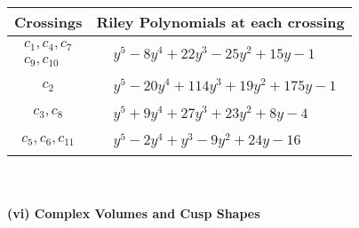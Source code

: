 \documentclass[1p]{elsarticle_modified}
\theoremstyle{definition}
\begin{document}
\begin{tabular}{m{50pt}|m{274pt}}
Crossings & \hspace{64pt}Riley Polynomials at each crossing \\
\hline $$\begin{aligned}c_{1},c_{4},c_{7}\\c_{9},c_{10}\end{aligned}$$&$\begin{aligned}
&y^5-8 y^4+22 y^3-25 y^2+15 y-1
\end{aligned}$\\
\hline $$\begin{aligned}c_{2}\end{aligned}$$&$\begin{aligned}
&y^5-20 y^4+114 y^3+19 y^2+175 y-1
\end{aligned}$\\
\hline $$\begin{aligned}c_{3},c_{8}\end{aligned}$$&$\begin{aligned}
&y^5+9 y^4+27 y^3+23 y^2+8 y-4
\end{aligned}$\\
\hline $$\begin{aligned}c_{5},c_{6},c_{11}\end{aligned}$$&$\begin{aligned}
&y^5-2 y^4+y^3-9 y^2+24 y-16
\end{aligned}$\\
\hline
\end{tabular}\\~\\
\newpage\flushleft \textbf{(vi) Complex Volumes and Cusp Shapes}
\end{document}
